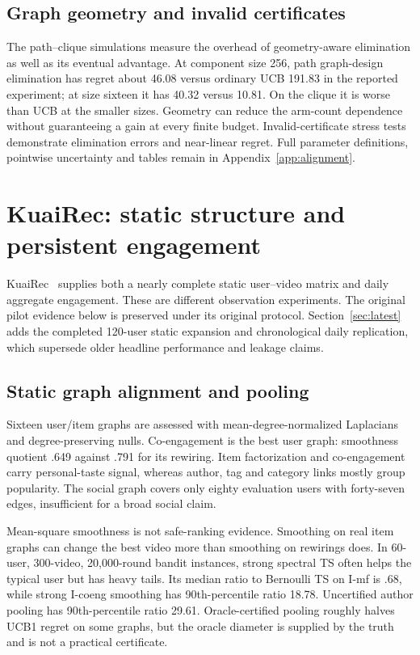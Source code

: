 \subsection{Graph geometry and invalid certificates}
The path--clique simulations measure the overhead of geometry-aware elimination as well as its eventual advantage. At component size 256, path graph-design elimination has regret about 46.08 versus ordinary UCB 191.83 in the reported experiment; at size sixteen it has 40.32 versus 10.81. On the clique it is worse than UCB at the smaller sizes. Geometry can reduce the arm-count dependence without guaranteeing a gain at every finite budget. Invalid-certificate stress tests demonstrate elimination errors and near-linear regret. Full parameter definitions, pointwise uncertainty and tables remain in Appendix~\ref{app:alignment}.

\section{KuaiRec: static structure and persistent engagement}

KuaiRec~\cite{kuairecdata} supplies both a nearly complete static user--video matrix and daily aggregate engagement. These are different observation experiments. The original pilot evidence below is preserved under its original protocol. Section~\ref{sec:latest} adds the completed 120-user static expansion and chronological daily replication, which supersede older headline performance and leakage claims.

\subsection{Static graph alignment and pooling}
Sixteen user/item graphs are assessed with mean-degree-normalized Laplacians and degree-preserving nulls. Co-engagement is the best user graph: smoothness quotient .649 against .791 for its rewiring. Item factorization and co-engagement carry personal-taste signal, whereas author, tag and category links mostly group popularity. The social graph covers only eighty evaluation users with forty-seven edges, insufficient for a broad social claim.

Mean-square smoothness is not safe-ranking evidence. Smoothing on real item graphs can change the best video more than smoothing on rewirings does. In 60-user, 300-video, 20,000-round bandit instances, strong spectral TS often helps the typical user but has heavy tails. Its median ratio to Bernoulli TS on I-mf is .68, while strong I-coeng smoothing has 90th-percentile ratio 18.78. Uncertified author pooling has 90th-percentile ratio 29.61. Oracle-certified pooling roughly halves UCB1 regret on some graphs, but the oracle diameter is supplied by the truth and is not a practical certificate.

